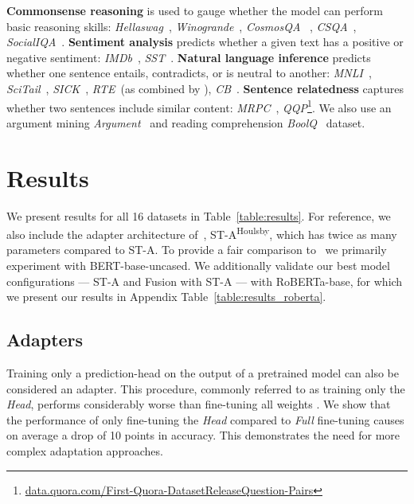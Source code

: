 \textbf{Commonsense reasoning} is used to gauge whether the model can perform basic reasoning skills: 
\textit{Hellaswag}~\cite[][]{zellers18swag, zellers19hellaswag}, \textit{Winogrande}~\cite[][]{Sakaguchi19winogrande}, \textit{CosmosQA}~ \cite[][]{Huang19cosmosqa}, \textit{CSQA}~\cite[][]{Talmor19CSQA}, \textit{SocialIQA}~\cite[][]{Sap19SocialIQA}. \textbf{Sentiment analysis} predicts whether a given text has a positive or negative sentiment: \textit{IMDb}~\cite[][]{Maas11IMDB}, \textit{SST}~\cite[][]{socher-etal-2013-recursive}. 
\textbf{Natural language inference} predicts whether one sentence entails, contradicts, or is neutral to another: \textit{MNLI}~\cite[][]{Williams18MNLI}, \textit{SciTail}~\cite[][]{ Khot18SciTail}, \textit{SICK}~\cite[][]{ marelli-etal-2014-sick}, \textit{RTE}~(as combined by \citet[][]{wang18glue}), \textit{CB}~\cite[][]{deMarneffe2019commitmentbank}. \textbf{Sentence relatedness} captures whether two sentences include similar content: \textit{MRPC}~\cite[][]{Dolan05MRPC}, \textit{QQP}\footnote{\href{http://data.quora.com/First-Quora-DatasetReleaseQuestion-Pairs}{data.quora.com/First-Quora-DatasetReleaseQuestion-Pairs}}. We also use an argument mining \textit{Argument}~\cite[][]{Stab18Argument} and reading comprehension \textit{BoolQ}~\cite[][]{Clark19BoolQ} dataset.

\section{Results}
\label{results}

We present results for all 16 datasets in Table~\ref{table:results}. 
For reference, we also include the adapter architecture of~\citet{houlsby2019parameter}, ST-A\textsuperscript{Houlsby}, which has twice as many parameters compared to \mbox{ST-A}. 
To provide a fair comparison to~\citet{stickland2019bert} we primarily experiment with BERT-base-uncased. We additionally validate our best model configurations --- \mbox{ST-A} and Fusion with \mbox{ST-A} --- with RoBERTa-base, for which we present our results in Appendix Table~\ref{table:results_roberta}. 

\subsection{Adapters}

Training only a prediction-head on the output of a pretrained model can also be considered an adapter. This procedure, commonly referred to as training only the \textit{Head},  performs considerably worse than fine-tuning all weights \cite{howard2018universal, peters2019tune}. We show that the performance of only fine-tuning the \textit{Head} compared to \textit{Full} fine-tuning causes on average a drop of 10 points in accuracy. This demonstrates the need for more complex adaptation approaches. 

